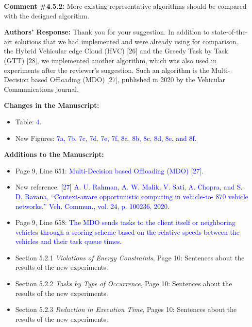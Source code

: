 \vspace{\baselineskip}

\begin{mdframed}[style=review] 
\textbf{Comment \#4.5.2:} More existing representative algorithms should be compared with the designed algorithm.
\end{mdframed}

\textbf{Authors' Response:} Thank you for your suggestion. In addition to state-of-the-art solutions that we had implemented and were already using for comparison, the Hybrid Vehicular edge Cloud (HVC) [26] and the Greedy Task by Task (GTT) [28], we implemented another algorithm, which was also used in experiments after the reviewer's suggestion. Such an algorithm is the Multi-Decision based Offloading (MDO) [27], published in 2020 by the Vehicular Communications journal.

\textbf{Changes in the Manuscript:} 

\begin{itemize}
    \item Table: \textcolor{blue}{4}.
    \item New Figures: \textcolor{blue}{7a, 7b, 7c, 7d, 7e, 7f, 8a, 8b, 8c, 8d, 8e, and 8f}.
\end{itemize}

\textbf{Additions to the Manuscript:}

\begin{itemize}
    \item Page 9, Line 651: \textcolor{blue}{Multi-Decision based Offloading (MDO) [27]}.
    \item New reference: \textcolor{blue}{[27] A. U. Rahman, A. W. Malik, V. Sati, A. Chopra, and S. D. Ravana, “Context-aware opportunistic computing in vehicle-to- 870 vehicle networks,” Veh. Commun., vol. 24, p. 100236, 2020}.
    \item Page 9, Line 658: \textcolor{blue}{The MDO sends tasks to the client itself or neighboring vehicles through a scoring scheme based on the relative speeds between the vehicles and their task queue times.}
    \item Section 5.2.1 \textit{Violations of Energy Constraints}, Page 10: Sentences about the results of the new experiments.
    \item Section 5.2.2 \textit{Tasks by Type of Occurrence}, Page 10: Sentences about the results of the new experiments.
    \item Section 5.2.3 \textit{Reduction in Execution Time}, Pages 10: Sentences about the results of the new experiments.
\end{itemize}
